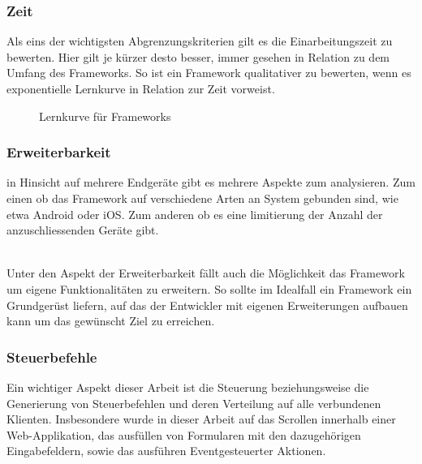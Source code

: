 	\subsubsection{Zeit}
	Als eins der wichtigsten Abgrenzungskriterien gilt es die Einarbeitungszeit zu bewerten. Hier gilt je kürzer desto besser, immer gesehen in Relation 	zu dem Umfang des Frameworks. So ist ein Framework qualitativer zu bewerten, wenn es exponentielle Lernkurve in Relation zur Zeit vorweist.

\begin{figure}[H]
	\centering
	\vspace{-25pt}
	\caption[Darstellung der Lernkurve für Frameworks]{Lernkurve für Frameworks}
\end{figure}
\vspace{-40pt}


	\pagebreak
	 \subsubsection{Erweiterbarkeit}
	 in Hinsicht auf mehrere Endgeräte gibt es mehrere Aspekte zum analysieren. Zum einen ob das Framework auf verschiedene 	Arten an System gebunden sind, wie etwa Android oder iOS. Zum anderen ob es eine limitierung der Anzahl der 				anzuschliessenden Geräte gibt. 

	\\Unter den Aspekt der Erweiterbarkeit fällt auch die Möglichkeit das Framework um eigene Funktionalitäten zu erweitern. So 		sollte im Idealfall ein Framework ein Grundgerüst liefern, auf das der Entwickler mit eigenen Erweiterungen aufbauen kann um 	das gewünscht Ziel zu erreichen.
	
	\subsubsection{Steuerbefehle}
	Ein wichtiger Aspekt dieser Arbeit ist die Steuerung beziehungsweise die Generierung von Steuerbefehlen und deren Verteilung auf alle verbundenen Klienten. Insbesondere wurde in dieser Arbeit auf das Scrollen innerhalb einer Web-Applikation, das ausfüllen von Formularen mit den dazugehörigen Eingabefeldern, sowie das ausführen Eventgesteuerter Aktionen.

